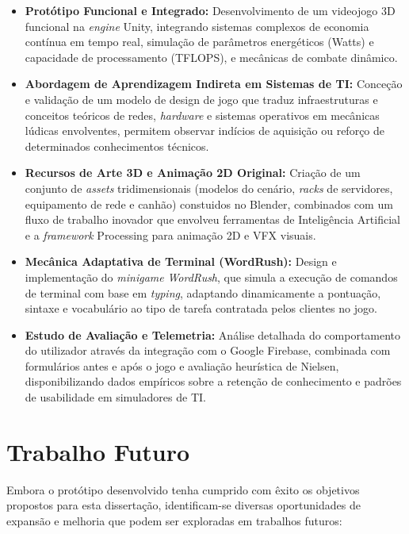 \begin{itemize}
    \item \textbf{Protótipo Funcional e Integrado:} Desenvolvimento de um videojogo 3D funcional na \textit{engine} Unity, integrando sistemas complexos de economia contínua em tempo real, simulação de parâmetros energéticos (Watts) e capacidade de processamento (TFLOPS), e mecânicas de combate dinâmico.
    \item \textbf{Abordagem de Aprendizagem Indireta em Sistemas de TI:} Conceção e validação de um modelo de design de jogo que traduz infraestruturas e conceitos teóricos de redes, \textit{hardware} e sistemas operativos em mecânicas lúdicas envolventes, permitem observar indícios de aquisição ou reforço de determinados conhecimentos técnicos.
    \item \textbf{Recursos de Arte 3D e Animação 2D Original:} Criação de um conjunto de \textit{assets} tridimensionais (modelos do cenário, \textit{racks} de servidores, equipamento de rede e canhão) constuidos no Blender, combinados com um fluxo de trabalho inovador que envolveu ferramentas de Inteligência Artificial e a \textit{framework} Processing para animação 2D e \ac{VFX} visuais.
    \item \textbf{Mecânica Adaptativa de Terminal (WordRush):} Design e implementação do \textit{minigame} \textit{WordRush}, que simula a execução de comandos de terminal com base em \textit{typing}, adaptando dinamicamente a pontuação, sintaxe e vocabulário ao tipo de tarefa contratada pelos clientes no jogo.
    \item \textbf{Estudo de Avaliação e Telemetria:} Análise detalhada do comportamento do utilizador através da integração com o Google Firebase, combinada com formulários antes e após o jogo e avaliação heurística de Nielsen, disponibilizando dados empíricos sobre a retenção de conhecimento e padrões de usabilidade em simuladores de TI.
\end{itemize}

\section{Trabalho Futuro}
\label{sec6_3}

Embora o protótipo desenvolvido tenha cumprido com êxito os objetivos propostos para esta dissertação, identificam-se diversas oportunidades de expansão e melhoria que podem ser exploradas em trabalhos futuros:

